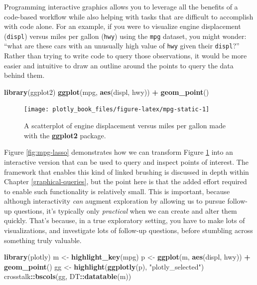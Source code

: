 \documentclass[
  12pt,
]{krantz}
\newenvironment{Shaded}{\begin{snugshade}}{\end{snugshade}}
\newcommand{\KeywordTok}[1]{\textcolor[rgb]{0.13,0.29,0.53}{\textbf{#1}}}
\newcommand{\NormalTok}[1]{#1}
\newcommand{\OperatorTok}[1]{\textcolor[rgb]{0.81,0.36,0.00}{\textbf{#1}}}
\newcommand{\StringTok}[1]{\textcolor[rgb]{0.31,0.60,0.02}{#1}}
\begin{document}
Programming interactive graphics allows you to leverage all the benefits of a code-based workflow while also helping with tasks that are difficult to accomplish with code alone. For an example, if you were to visualize engine displacement (\texttt{displ}) versus miles per gallon (\texttt{hwy}) using the \texttt{mpg} dataset, you might wonder: ``what are these cars with an unusually high value of \texttt{hwy} given their \texttt{displ}?'' Rather than trying to write code to query those observations, it would be more easier and intuitive to draw an outline around the points to query the data behind them.

\begin{Shaded}
\begin{Highlighting}[]
\KeywordTok{library}\NormalTok{(ggplot2)}
\KeywordTok{ggplot}\NormalTok{(mpg, }\KeywordTok{aes}\NormalTok{(displ, hwy)) }\OperatorTok{+}\StringTok{ }\KeywordTok{geom_point}\NormalTok{()}
\end{Highlighting}
\end{Shaded}

\begin{figure}

{\centering \texttt{[image: plotly\_book\_files/figure-latex/mpg-static-1]} 

}

\caption{A scatterplot of engine displacement versus miles per gallon made with the \textbf{ggplot2} package.}\label{fig:mpg-static}
\end{figure}

Figure \ref{fig:mpg-lasso} demonstrates how we can transform Figure \ref{fig:mpg-static} into an interactive version that can be used to query and inspect points of interest. The framework that enables this kind of linked brushing is discussed in depth within Chapter \ref{graphical-queries}, but the point here is that the added effort required to enable such functionality is relatively small. This is important, because although interactivity \emph{can} augment exploration by allowing us to pursue follow-up questions, it's typically only \emph{practical} when we can create and alter them quickly. That's because, in a true exploratory setting, you have to make lots of visualizations, and investigate lots of follow-up questions, before stumbling across something truly valuable.

\begin{Shaded}
\begin{Highlighting}[]
\KeywordTok{library}\NormalTok{(plotly)}
\NormalTok{m <-}\StringTok{ }\KeywordTok{highlight_key}\NormalTok{(mpg)}
\NormalTok{p <-}\StringTok{ }\KeywordTok{ggplot}\NormalTok{(m, }\KeywordTok{aes}\NormalTok{(displ, hwy)) }\OperatorTok{+}\StringTok{ }\KeywordTok{geom_point}\NormalTok{()}
\NormalTok{gg <-}\StringTok{ }\KeywordTok{highlight}\NormalTok{(}\KeywordTok{ggplotly}\NormalTok{(p), }\StringTok{"plotly_selected"}\NormalTok{)}
\NormalTok{crosstalk}\OperatorTok{::}\KeywordTok{bscols}\NormalTok{(gg, DT}\OperatorTok{::}\KeywordTok{datatable}\NormalTok{(m))}
\end{Highlighting}
\end{Shaded}
\end{document}
